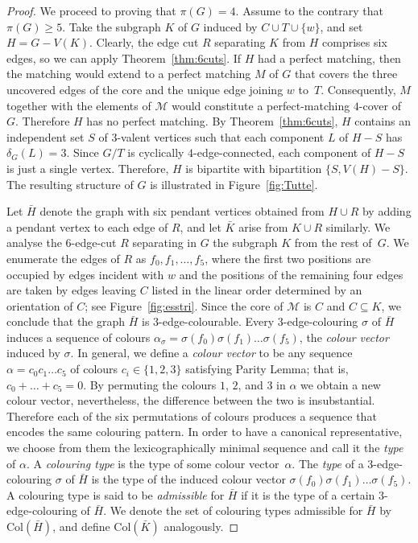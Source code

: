 \documentclass[a4paper]{amsart}
\newcommand{\Col}{{\mathrm{Col}}}
\theoremstyle{plain}
\theoremstyle{definition}
\begin{document}
\begin{proof}
We proceed to proving that $\pi(G)=4$. Assume to the contrary
that $\pi(G)\ge 5$. Take the subgraph $K$ of $G$ induced by
$C\cup T\cup\{w\}$, and set $H=G-V(K)$. Clearly, the edge cut
$R$ separating $K$ from $H$ comprises six edges, so we can
apply Theorem~\ref{thm:6cuts}. If $H$ had a perfect matching,
then the matching would extend to a perfect matching $M$ of $G$
that covers the three uncovered edges of the core and the
unique edge joining $w$ to~$T$. Consequently, $M$ together with
the elements of $\mathcal{M}$ would constitute a
perfect-matching $4$-cover of~$G$. Therefore $H$ has no perfect
matching. By Theorem~\ref{thm:6cuts}, $H$ contains an
independent set $S$ of $3$-valent vertices such that each
component $L$ of $H-S$ has $\delta_G(L)=3$. Since $G/T$ is
cyclically $4$-edge-connected, each component of $H-S$ is just
a single vertex. Therefore, $H$ is bipartite with bipartition
$\{S,V(H)-S\}$. The resulting structure of $G$ is illustrated
in  Figure~\ref{fig:Tutte}.

Let $\bar H$ denote the graph with six pendant vertices
obtained from $H\cup R$ by adding a pendant vertex to each edge
of $R$, and let $\bar K$ arise from $K\cup R$ similarly. We
analyse the $6$-edge-cut $R$ separating in $G$ the subgraph $K$
from the rest of~$G$. We enumerate the edges of $R$ as
$f_0,f_1,\ldots,f_5$, where the first two positions are
occupied by edges incident with $w$ and the positions of the
remaining four edges are taken by edges leaving $C$ listed in
the linear order determined by an orientation of $C$; see
Figure~\ref{fig:esstri}. Since the core of $\mathcal{M}$ is $C$
and $C\subseteq K$, we conclude that the graph $\bar H$ is
$3$-edge-colourable. Every $3$-edge-colouring $\sigma$ of $\bar
H$ induces a sequence of colours
$\alpha_{\sigma}=\sigma(f_0)\sigma(f_1)\ldots\sigma(f_5)$, the
\emph{colour vector} induced by $\sigma$. In general, we define
a \emph{colour vector} to be any sequence $\alpha=c_0c_1\ldots
c_5$ of colours $c_i\in\{1,2,3\}$ satisfying Parity Lemma; that
is, $c_0+\ldots+c_5=0$. By permuting the colours $1$, $2$, and
$3$ in $\alpha$ we obtain a new colour vector, nevertheless,
the difference between the two is insubstantial. Therefore each
of the six permutations of colours produces a sequence that
encodes the same colouring pattern. In order to have a
canonical representative, we choose from them the
lexicographically minimal sequence and call it the \emph{type}
of $\alpha$. A \emph{colouring type} is the type of some colour
vector~$\alpha$. The \emph{type} of a $3$-edge-colouring
$\sigma$ of $\bar H$ is the type of the induced colour vector
$\sigma(f_0)\sigma(f_1)\ldots\sigma(f_5)$. A colouring type is
said to be  \emph{admissible} for $\bar H$ if it is the type of
a certain $3$-edge-colouring of $\bar H$. We denote the set of
colouring types admissible for $\bar H$ by $\Col(\bar H)$, and
define $\Col(\bar K)$ analogously.


\end{proof}
\end{document}
